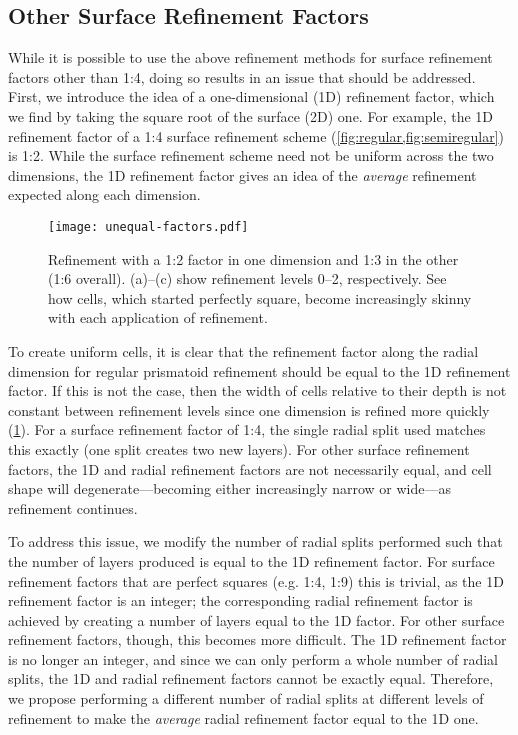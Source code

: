 \subsection{Other Surface Refinement Factors} \label{chap:5:factors}
While it is possible to use the above refinement methods for surface refinement factors other than 1:4, doing so results in an issue that should be addressed.
First, we introduce the idea of a one-dimensional (1D) refinement factor, which we find by taking the square root of the surface (2D) one.
For example, the 1D refinement factor of a 1:4 surface refinement scheme (\cref{fig:regular,fig:semiregular}) is 1:2.
While the surface refinement scheme need not be uniform across the two dimensions, the 1D refinement factor gives an idea of the \textit{average} refinement expected along each dimension.


\begin{figure}[ht!]
	\centering
	\texttt{[image: unequal-factors.pdf]}
	\caption[Demonstration of refinement with unequal factors in different dimensions]{
		Refinement with a 1:2 factor in one dimension and 1:3 in the other (1:6 overall).
		(a)--(c) show refinement levels 0--2, respectively.
		See how cells, which started perfectly square, become increasingly skinny with each application of refinement.
	}
	\label{fig:unequal-factors}
\end{figure}


To create uniform cells, it is clear that the refinement factor along the radial dimension for regular prismatoid refinement should be equal to the 1D refinement factor.
If this is not the case, then the width of cells relative to their depth is not constant between refinement levels since one dimension is refined more quickly (\cref{fig:unequal-factors}).
For a surface refinement factor of 1:4, the single radial split used matches this exactly (one split creates two new layers).
For other surface refinement factors, the 1D and radial refinement factors are not necessarily equal, and cell shape will degenerate---becoming either increasingly narrow or wide---as refinement continues.


To address this issue, we modify the number of radial splits performed such that the number of layers produced is equal to the 1D refinement factor.
For surface refinement factors that are perfect squares (e.g.
1:4, 1:9) this is trivial, as the 1D refinement factor is an integer; the corresponding radial refinement factor is achieved by creating a number of layers equal to the 1D factor.
For other surface refinement factors, though, this becomes more difficult.
The 1D refinement factor is no longer an integer, and since we can only perform a whole number of radial splits, the 1D and radial refinement factors cannot be exactly equal.
Therefore, we propose performing a different number of radial splits at different levels of refinement to make the \textit{average} radial refinement factor equal to the 1D one.


